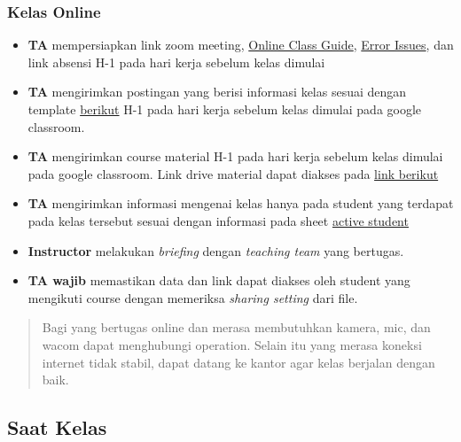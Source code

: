 \documentclass[
]{book}
\providecommand{\tightlist}{%
  \setlength{\itemsep}{0pt}\setlength{\parskip}{0pt}}
\begin{document}
\hypertarget{kelas-online}{%
\subsubsection{Kelas Online}\label{kelas-online}}

\begin{itemize}
\tightlist
\item
  \textbf{TA} mempersiapkan link zoom meeting, \href{https://docs.google.com/document/d/16algZSEqLos2fksPcbmpUrpvvuVr62msVY13M8uPNos/edit?usp=sharing}{Online Class Guide}, \href{https://docs.google.com/document/d/1ZkhuxSTBjUqzbHeLsRbk8E4L1FFymWH0UmaI3xaomkg/edit?usp=sharing}{Error Issues}, dan link absensi H-1 pada hari kerja sebelum kelas dimulai
\item
  \textbf{TA} mengirimkan postingan yang berisi informasi kelas sesuai dengan template \href{https://docs.google.com/document/d/1leWbp3Eb2AwumFieuHiWStSNOXsKJQJD_h0tAhA2fLs/edit?usp=sharing}{berikut} H-1 pada hari kerja sebelum kelas dimulai pada google classroom.
\item
  \textbf{TA} mengirimkan course material H-1 pada hari kerja sebelum kelas dimulai pada google classroom. Link drive material dapat diakses pada \href{https://drive.google.com/drive/folders/1I1h0p4BkvkUYV8mtDU7bgswE_awOIxWY?usp=sharing}{link berikut}
\item
  \textbf{TA} mengirimkan informasi mengenai kelas hanya pada student yang terdapat pada kelas tersebut sesuai dengan informasi pada sheet \href{https://docs.google.com/spreadsheets/d/12FB9410fhRhZp9jl5qLe7x-LGw0QTSfLujA-dE867JE/edit?usp=sharing}{active student}
\item
  \textbf{Instructor} melakukan \emph{briefing} dengan \emph{teaching team} yang bertugas.
\item
  \textbf{TA wajib} memastikan data dan link dapat diakses oleh student yang mengikuti course dengan memeriksa \emph{sharing setting} dari file.
\end{itemize}

\begin{quote}
Bagi yang bertugas online dan merasa membutuhkan kamera, mic, dan wacom dapat menghubungi operation. Selain itu yang merasa koneksi internet tidak stabil, dapat datang ke kantor agar kelas berjalan dengan baik.
\end{quote}

\hypertarget{saat-kelas}{%
\subsection{Saat Kelas}\label{saat-kelas}}
\end{document}
